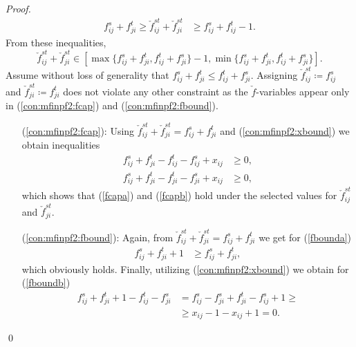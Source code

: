 \begin{proof}
\begin{subequations}
\begin{align}
\label{fboundb}f^s_{ij}+ f^t_{ji}\geq\check{f}^{st}_{ij} + \check{f}^{st}_{ji} &\geq f^s_{ij} + f^t_{ij}-1. 
\end{align}
\end{subequations}
From these inequalities,
$$
\check{f}^{st}_{ij} + \check{f}^{st}_{ji}\in\left[\max\{f^s_{ij}+f^t_{ji},f^t_{ij}+f^s_{ji}\}-1,\min\{f^s_{ij}+f^t_{ji},f^t_{ij}+f^s_{ji}\}\right].
$$
Assume without loss of generality that $f^s_{ij} + f^t_{ji}\leq f^t_{ij} + f^s_{ji}$. Assigning $\check{f}^{st}_{ij}\coloneqq f^s_{ij}$ and $\check{f}^{st}_{ji}\coloneqq f^t_{ji}$ does not violate any other constraint as the $\check{f}$-variables appear only in (\ref{con:mfinpf2:fcap}) and (\ref{con:mfinpf2:fbound}).
\begin{itemize}[leftmargin=1cm]
\item[(\ref{con:mfinpf2:fcap}):]  Using $\check{f}^{st}_{ij} + \check{f}^{st}_{ji} = f^{s}_{ij} + f^{t}_{ji}$ and (\ref{con:mfinpf2:xbound}) we obtain inequalities
	\begin{align*}
	f^{s}_{ij} + f^{t}_{ji}-f^t_{ij}-f^s_{ij}+x_{ij}&\geq 0,\\
	f^{s}_{ij} + f^{t}_{ji}-f^t_{ji}-f^s_{ji}+x_{ij}&\geq 0,
	\end{align*}
	which shows that (\ref{fcapa}) and (\ref{fcapb}) hold under the selected values for $\check{f}^{st}_{ij}$ and $\check{f}^{st}_{ji}$.
\item[(\ref{con:mfinpf2:fbound}):] Again, from $\check{f}^{st}_{ij} + \check{f}^{st}_{ji} = f^{s}_{ij} + f^{t}_{ji}$  we get for (\ref{fbounda})
	\begin{align*}
	f^{s}_{ij} + f^{t}_{ji} + 1 &\geq f^s_{ij}+f^t_{ji},
	\end{align*}
	which obviously holds. Finally, utilizing (\ref{con:mfinpf2:xbound}) we obtain for (\ref{fboundb})
	\begin{align*}
	f^{s}_{ij} + f^{t}_{ji} + 1 -f^t_{ij}-f^s_{ji} &= f^s_{ij}-f^s_{ji}+f^t_{ji}-f^s_{ij}+1 \geq \\
	&\geq x_{ij}-1-x_{ij}+1=0.
	\end{align*}
\end{itemize}\qed
\end{proof} 
